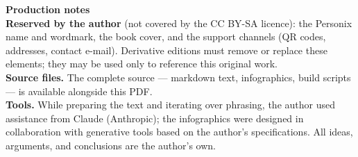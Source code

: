\clearpage
\thispagestyle{empty}
\begin{flushleft}\small\sffamily
\textbf{Production notes}\\[1.2em]

\textbf{Reserved by the author} (not covered by the CC BY-SA licence): the
Personix name and wordmark, the book cover, and the support channels (QR
codes, addresses, contact e-mail). Derivative editions must remove or replace
these elements; they may be used only to reference this original work.\\[1.2em]

\textbf{Source files.} The complete source --- markdown text, infographics,
build scripts --- is available alongside this PDF.\\[1.2em]

\textbf{Tools.} While preparing the text and iterating over phrasing, the
author used assistance from Claude (Anthropic); the infographics were designed
in collaboration with generative tools based on the author's specifications.
All ideas, arguments, and conclusions are the author's own.
\end{flushleft}
\clearpage
